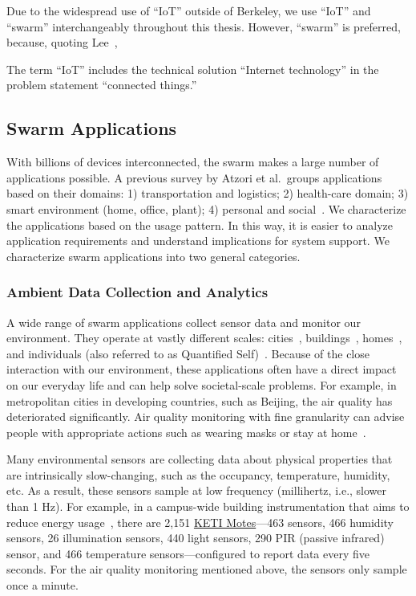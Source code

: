 Due to the widespread use of ``IoT'' outside of Berkeley, we use ``IoT'' and
``swarm'' interchangeably throughout this thesis. However, ``swarm'' is
preferred, because, quoting Lee~\cite{lee2016iot},

\begin{displayquote}
  The term ``IoT'' includes the technical solution ``Internet technology'' in
  the problem statement ``connected things.''
\end{displayquote}

\subsection{Swarm Applications}
\label{sec:swarm-applications}

With billions of devices interconnected, the swarm makes a large number of
applications possible. A previous survey by Atzori et al.\, groups applications
based on their domains: 1) transportation and logistics; 2) health-care domain;
3) smart environment (home, office, plant); 4) personal and
social~\cite{atzori2010internet}. We characterize the applications based on the
usage pattern. In this way, it is easier to analyze application requirements and
understand implications for system support. We characterize swarm applications
into two general categories.

\subsubsection{Ambient Data Collection and Analytics}
\label{sec:ambi-data-coll}

A wide range of swarm applications collect sensor data and monitor our
environment. They operate at vastly different scales:
cities~\cite{cheng2014aircloud, sfpark}, buildings~\cite{dawson2010smap},
homes~\cite{hnat2011hitchhiker}, and individuals (also referred to as Quantified
Self)~\cite{fitbit, swan2013quantified}. Because of the close interaction with
our environment, these applications often have a direct impact on our everyday
life and can help solve societal-scale problems. For example, in metropolitan
cities in developing countries, such as Beijing, the air quality has
deteriorated significantly. Air quality monitoring with fine granularity can
advise people with appropriate actions such as wearing masks or stay at
home~\cite{cheng2014aircloud}.

Many environmental sensors are collecting data about physical properties that
are intrinsically slow-changing, such as the occupancy, temperature, humidity,
etc. As a result, these sensors sample at low frequency (millihertz, i.e.,
slower than 1 Hz). For example, in a campus-wide building instrumentation that
aims to reduce energy usage~\cite{krioukov2012building}, there are 2,151
\href{http://www.keti.re.kr/}{KETI Motes}---463  sensors, 466 humidity
sensors, 26 illumination sensors, 440 light sensors, 290 PIR (passive infrared)
sensor, and 466 temperature sensors---configured to report data every five
seconds. For the air quality monitoring mentioned above, the sensors only sample
once a minute.

